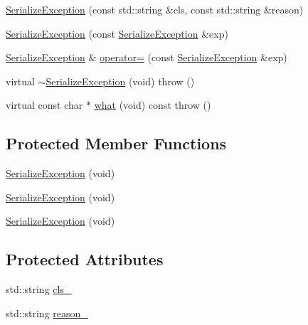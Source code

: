 \begin{DoxyCompactItemize}
\mbox{\hyperlink{classFILEDB_1_1SerializeException_aab805dbcb5d495f039ec743780e5e1a2}{Serialize\+Exception}} (const std\+::string \&cls, const std\+::string \&reason)
\item 
\mbox{\hyperlink{classFILEDB_1_1SerializeException_a4583fae246a4b2d2f468c3a4ec0ecb08}{Serialize\+Exception}} (const \mbox{\hyperlink{classFILEDB_1_1SerializeException}{Serialize\+Exception}} \&exp)
\item 
\mbox{\hyperlink{classFILEDB_1_1SerializeException}{Serialize\+Exception}} \& \mbox{\hyperlink{classFILEDB_1_1SerializeException_a6ec9d7b0679c5752e900d30b92015302}{operator=}} (const \mbox{\hyperlink{classFILEDB_1_1SerializeException}{Serialize\+Exception}} \&exp)
\item 
virtual \mbox{\hyperlink{classFILEDB_1_1SerializeException_ace236a2abdc486c44c695fbdc209923a}{$\sim$\+Serialize\+Exception}} (void)  throw ()
\item 
virtual const char $\ast$ \mbox{\hyperlink{classFILEDB_1_1SerializeException_a1c143c27480a4c2d85f20a19b3061add}{what}} (void) const  throw ()
\end{DoxyCompactItemize}
\subsection*{Protected Member Functions}
\begin{DoxyCompactItemize}
\item 
\mbox{\hyperlink{classFILEDB_1_1SerializeException_a84b139cba956139f16f27094d53fd68a}{Serialize\+Exception}} (void)
\item 
\mbox{\hyperlink{classFILEDB_1_1SerializeException_a84b139cba956139f16f27094d53fd68a}{Serialize\+Exception}} (void)
\item 
\mbox{\hyperlink{classFILEDB_1_1SerializeException_a84b139cba956139f16f27094d53fd68a}{Serialize\+Exception}} (void)
\end{DoxyCompactItemize}
\subsection*{Protected Attributes}
\begin{DoxyCompactItemize}
\item 
std\+::string \mbox{\hyperlink{classFILEDB_1_1SerializeException_ad82d67694aa41ca34cf81226c07f2b42}{cls\+\_\+}}
\item 
std\+::string \mbox{\hyperlink{classFILEDB_1_1SerializeException_aa9e4b477e71cc170bda3a4ff2a4822de}{reason\+\_\+}}
\end{DoxyCompactItemize}


